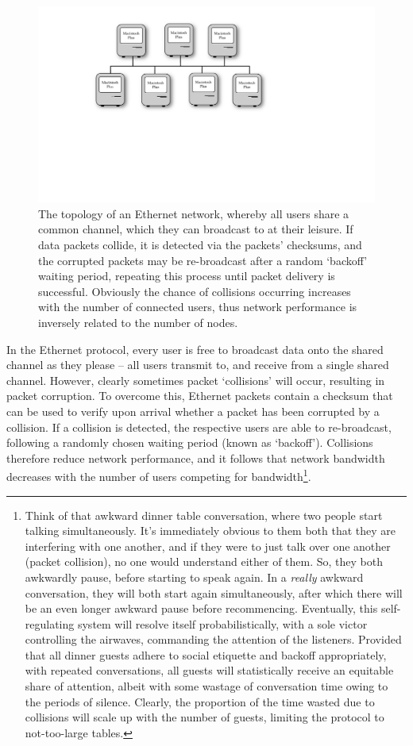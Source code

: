 \documentclass[aps,rmp,twocolumn,amsmath,amssymb,nofootinbib,superscriptaddress,longbibliography,floatfix,table-of-contents,eqsecnum]{revtex4-1}
\begin{document}
\begin{figure}[!htb]
	\includegraphics[width=\columnwidth]{ethernet}
	\caption{The topology of an Ethernet network, whereby all users share a common channel, which they can broadcast to at their leisure. If data packets collide, it is detected via the packets' checksums, and the corrupted packets may be re-broadcast after a random `backoff' waiting period, repeating this process until packet delivery is successful. Obviously the chance of collisions occurring increases with the number of connected users, thus network performance is inversely related to the number of nodes.} \label{fig:ethernet}
\end{figure}

In the Ethernet protocol, every user is free to broadcast data onto the shared channel as they please -- all users transmit to, and receive from a single shared channel. However, clearly sometimes packet `collisions' will occur, resulting in packet corruption. To overcome this, Ethernet packets contain a checksum that can be used to verify upon arrival whether a packet has been corrupted by a collision. If a collision is detected, the respective users are able to re-broadcast, following a randomly chosen waiting period (known as `backoff'). Collisions therefore reduce network performance, and it follows that network bandwidth decreases with the number of users competing for bandwidth\footnote{Think of that awkward dinner table conversation, where two people start talking simultaneously. It's immediately obvious to them both that they are interfering with one another, and if they were to just talk over one another (packet collision), no one would understand either of them. So, they both awkwardly pause, before starting to speak again. In a \textit{really} awkward conversation, they will both start again simultaneously, after which there will be an even longer awkward pause before recommencing. Eventually, this self-regulating system will resolve itself probabilistically, with a sole victor controlling the airwaves, commanding the attention of the listeners. Provided that all dinner guests adhere to social etiquette and backoff appropriately, with repeated conversations, all guests will statistically receive an equitable share of attention, albeit with some wastage of conversation time owing to the periods of silence. Clearly, the proportion of the time wasted due to collisions will scale up with the number of guests, limiting the protocol to not-too-large tables.}.
\end{document}
